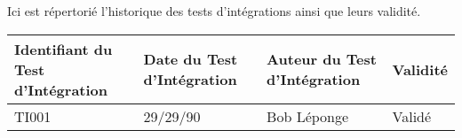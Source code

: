 
Ici est répertorié l'historique des tests d'intégrations ainsi que leurs validité. \\

\begin{table}[H]
\centering
	\begin{tabularx}{17.4cm}{|X|X|X|X|}
	\hline
	\rowcolor{gray!40} Identifiant du Test d'Intégration & Date du Test d'Intégration & Auteur du Test d'Intégration & Validité\\
	\hline
	 TI001 & 29/29/90 & Bob Léponge & Validé \\
	\hline
	\end{tabularx}
\end{table}

